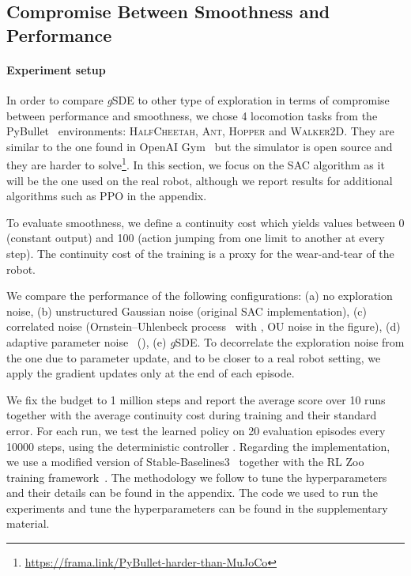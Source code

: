 \documentclass{article}
\newcommand{\ourSDE}{\textit{g}\textsc{SDE}\xspace}
\newcommand{\ppo}{\textsc{PPO}\xspace}
\newcommand{\sac}{\textsc{SAC}\xspace}
\newcommand{\hc}{\textsc{HalfCheetah}\xspace}
\newcommand{\hopper}{\textsc{Hopper}\xspace}
\newcommand{\ant}{\textsc{Ant}\xspace}
\newcommand{\walker}{\textsc{Walker2D}\xspace}
\begin{document}
\subsection{Compromise Between Smoothness and Performance}
\label{sec:pybullet-envs}


\paragraph{Experiment setup}

In order to compare \ourSDE to other type of exploration in terms of compromise between performance and smoothness,
we chose 4 locomotion tasks from the PyBullet~\citep{coumans2019bullet} environments: \hc, \ant, \hopper and \walker.
They are similar to the one found in OpenAI Gym~\citep{brockman2016openai} but the simulator is open source and they are harder to solve\footnote{\url{https://frama.link/PyBullet-harder-than-MuJoCo}}.
In this section, we focus on the \sac algorithm as it will be the one used on the real robot, although we report results for additional algorithms such as \ppo in the appendix.

To evaluate smoothness, we define a continuity cost  which yields values between 0 (constant output) and 100 (action jumping from one limit to another at every step). The continuity cost of the training  is a proxy for the wear-and-tear of the robot.

We compare the performance of the following configurations: (a) no exploration noise, (b) unstructured Gaussian noise (original \sac implementation), (c) correlated noise (Ornstein–Uhlenbeck process~\citep{uhlenbeck1930theory} with , OU noise in the figure), (d) adaptive parameter noise~\citep{plappert2017parameter} (), (e) \ourSDE.
To decorrelate the exploration noise from the one due to parameter update, and to be closer to a real robot setting, we apply the gradient updates only at the end of each episode.

We fix the budget to 1 million steps and report the average score over 10 runs together with the average continuity cost during training and their standard error.
For each run, we test the learned policy on 20 evaluation episodes every 10000 steps, using the deterministic controller .
Regarding the implementation,
we use a modified version of Stable-Baselines3~\citep{raffin2019baselines3} together with the RL Zoo training framework~\citep{raffin2020zoo3}.
The methodology we follow to tune the hyperparameters and their details can be found in the appendix.
The code we used to run the experiments and tune the hyperparameters can be found in the supplementary material.
\end{document}

